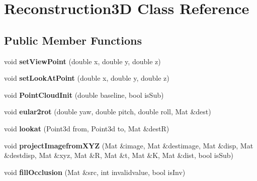 \hypertarget{class_reconstruction3_d}{}\section{Reconstruction3D Class Reference}
\label{class_reconstruction3_d}
\subsection*{Public Member Functions}
\begin{DoxyCompactItemize}
\item 
void {\bfseries set\+View\+Point} (double x, double y, double z)\hypertarget{class_reconstruction3_d_a009c31d0f4ea78d4cc2caa3179085a59}{}\label{class_reconstruction3_d_a009c31d0f4ea78d4cc2caa3179085a59}

\item 
void {\bfseries set\+Look\+At\+Point} (double x, double y, double z)\hypertarget{class_reconstruction3_d_a0ab55481261b0a6f8c238a9944cb3377}{}\label{class_reconstruction3_d_a0ab55481261b0a6f8c238a9944cb3377}

\item 
void {\bfseries Point\+Cloud\+Init} (double baseline, bool is\+Sub)\hypertarget{class_reconstruction3_d_a3aa623f596ea3fbb9aec4e2bd8149778}{}\label{class_reconstruction3_d_a3aa623f596ea3fbb9aec4e2bd8149778}

\item 
void {\bfseries eular2rot} (double yaw, double pitch, double roll, Mat \&dest)\hypertarget{class_reconstruction3_d_a5c411c85a0c7bfe6d5d2bc6e06da324e}{}\label{class_reconstruction3_d_a5c411c85a0c7bfe6d5d2bc6e06da324e}

\item 
void {\bfseries lookat} (Point3d from, Point3d to, Mat \&destR)\hypertarget{class_reconstruction3_d_aa87d4367eee898a16c82cef4266e43ab}{}\label{class_reconstruction3_d_aa87d4367eee898a16c82cef4266e43ab}

\item 
void {\bfseries project\+Imagefrom\+X\+YZ} (Mat \&image, Mat \&destimage, Mat \&disp, Mat \&destdisp, Mat \&xyz, Mat \&R, Mat \&t, Mat \&K, Mat \&dist, bool is\+Sub)\hypertarget{class_reconstruction3_d_a771b752742d2a939b66b561946628df7}{}\label{class_reconstruction3_d_a771b752742d2a939b66b561946628df7}

\item 
void {\bfseries fill\+Occlusion} (Mat \&src, int invalidvalue, bool is\+Inv)\hypertarget{class_reconstruction3_d_a2b5edbc0e4ed41ed0bd4e3bbb9aa46ae}{}\label{class_reconstruction3_d_a2b5edbc0e4ed41ed0bd4e3bbb9aa46ae}

\end{DoxyCompactItemize}
